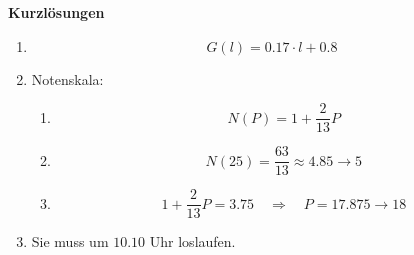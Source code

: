 \clearpage
\textbf{Kurzlösungen}

\begin{enumerate}
    \item
          \[
              {G(l)=0.17\cdot l+0.8}
          \]

    \item Notenskala:
          \begin{enumerate}
              \item
                    \[
                        {N(P)=1+\frac{2}{13}P}
                    \]

              \item
                    \[
                        N(25)=\frac{63}{13}\approx4.85 \rightarrow 5
                    \]


              \item
                    \[
                        1+\frac{2}{13}P=3.75
                        \quad\Longrightarrow\quad P=17.875 \rightarrow 18
                    \]

          \end{enumerate}

    \item

          Sie muss um \({10.10\text{ Uhr}}\) loslaufen.
\end{enumerate}




































\clearpage
